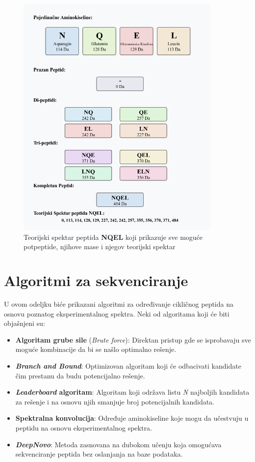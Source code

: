 \documentclass[12pt,oneside]{memoir}
\begin{document}
\begin{figure}[h]
  \centering
  \includegraphics[width=0.9\textwidth]{images/peptide-theoretical-spectrum.png}
  \caption{Teorijski spektar peptida \textbf{NQEL} koji prikazuje sve moguće potpeptide, njihove mase i njegov teorijski spektar}
  \label{fig:spektar}
\end{figure}


\chapter{Algoritmi za sekvenciranje}
U ovom odeljku biće prikazani algoritmi za određivanje cikličnog peptida na osnovu poznatog eksperimentalnog spektra. Neki od algoritama koji će biti objašnjeni su:
\begin{itemize}
    \item \textbf{Algoritam grube sile} (\emph{Brute force}): Direktan pristup gde se isprobavaju sve moguće kombinacije da bi se našlo optimalno rešenje.
    \item \textbf{\emph{Branch and Bound}}: Optimizovan algoritam koji će odbacivati kandidate čim prestanu da budu potencijalno rešenje.
    \item \textbf{\emph{Leaderboard} algoritam}: Algoritam koji održava listu \emph{N} najboljih kandidata za rešenje i na osnovu njih smanjuje broj potencijalnih kandidata.
    \item \textbf{Spektralna konvolucija}: Određuje aminokiseline koje mogu da učestvuju u peptidu na osnovu eksperimentalnog spektra.
    \item \textbf{\emph{DeepNovo}}: Metoda zasnovana na dubokom učenju koja omogućava sekvenciranje peptida bez oslanjanja na baze podataka.
\end{itemize}
\end{document}
